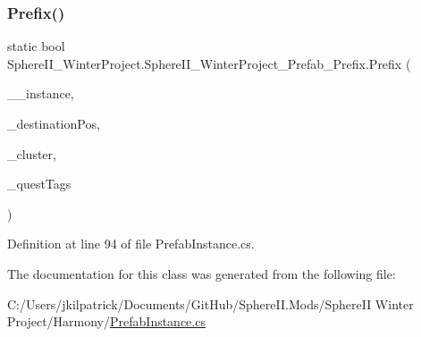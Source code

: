 \subsubsection{\texorpdfstring{Prefix()}{Prefix()}}
{\footnotesize\ttfamily static bool Sphere\+I\+I\+\_\+\+Winter\+Project.\+Sphere\+I\+I\+\_\+\+Winter\+Project\+\_\+\+Prefab\+\_\+\+Prefix.\+Prefix (\begin{DoxyParamCaption}\item[{Prefab}]{\+\_\+\+\_\+instance,  }\item[{ref Vector3i}]{\+\_\+destination\+Pos,  }\item[{Chunk\+Cluster}]{\+\_\+cluster,  }\item[{Quest\+Tags}]{\+\_\+quest\+Tags }\end{DoxyParamCaption})\hspace{0.3cm}{\ttfamily [static]}}



Definition at line 94 of file Prefab\+Instance.\+cs.



The documentation for this class was generated from the following file\+:\begin{DoxyCompactItemize}
\item 
C\+:/\+Users/jkilpatrick/\+Documents/\+Git\+Hub/\+Sphere\+I\+I.\+Mods/\+Sphere\+I\+I Winter Project/\+Harmony/\mbox{\hyperlink{_prefab_instance_8cs}{Prefab\+Instance.\+cs}}\end{DoxyCompactItemize}
